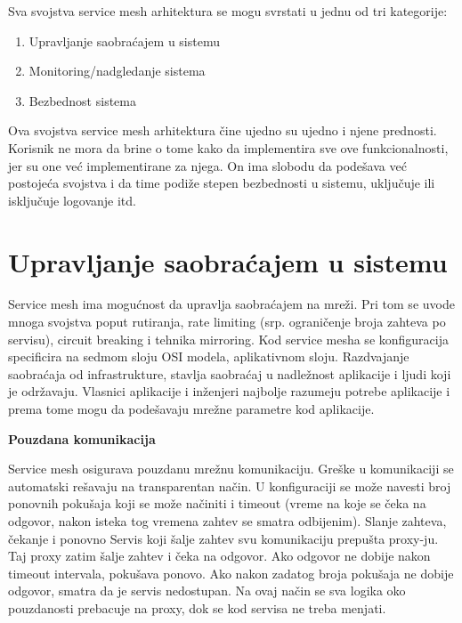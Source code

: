 \documentclass[a4paper,12pt]{report}
\begin{document}
Sva svojstva service mesh arhitektura se mogu svrstati u jednu od tri kategorije:

\begin{enumerate}
	\item Upravljanje saobraćajem u sistemu
	\item Monitoring/nadgledanje sistema
	\item Bezbednost sistema
\end{enumerate}

Ova svojstva service mesh arhitektura čine ujedno su ujedno i njene prednosti. Korisnik ne mora da brine o tome kako da implementira sve ove funkcionalnosti, jer su one već implementirane za njega. On ima slobodu da podešava već postojeća svojstva i da time podiže stepen bezbednosti u sistemu, uključuje ili isključuje logovanje itd. 

\section{Upravljanje saobraćajem u sistemu}

Service mesh ima mogućnost da upravlja saobraćajem na mreži. Pri tom se uvode mnoga svojstva poput rutiranja, rate limiting (srp. ograničenje broja zahteva po servisu),  circuit breaking i tehnika mirroring. Kod service mesha se konfiguracija specificira na sedmom sloju OSI modela, aplikativnom sloju. Razdvajanje saobraćaja od infrastrukture, stavlja saobraćaj u nadležnost aplikacije i ljudi koji je održavaju. Vlasnici aplikacije i inženjeri najbolje razumeju potrebe aplikacije i prema tome mogu da podešavaju mrežne parametre kod aplikacije. \newline

\textbf{Pouzdana komunikacija}\newline

Service mesh osigurava pouzdanu mrežnu komunikaciju. Greške u komunikaciji se automatski rešavaju na transparentan način. U konfiguraciji se može navesti broj ponovnih pokušaja koji se može načiniti i timeout (vreme na koje se čeka na odgovor, nakon isteka tog vremena zahtev se smatra odbijenim). Slanje zahteva, čekanje i ponovno  Servis koji šalje zahtev svu komunikaciju prepušta proxy-ju. Taj proxy zatim šalje zahtev i čeka na odgovor. Ako odgovor ne dobije nakon timeout intervala, pokušava ponovo. Ako nakon zadatog broja pokušaja ne dobije odgovor, smatra da je servis nedostupan.  Na ovaj način se sva logika oko pouzdanosti prebacuje na proxy, dok se kod servisa ne treba menjati. \newline
\end{document}
